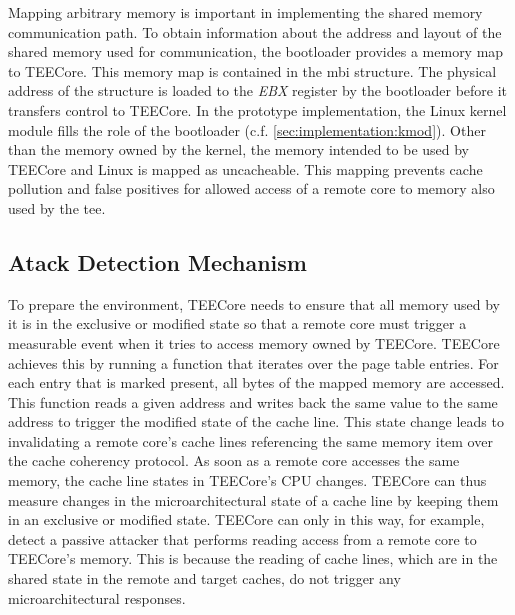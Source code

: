 Mapping arbitrary memory is important in implementing the shared memory
communication path. To obtain information about the address and layout of the
shared memory used for communication, the bootloader provides a memory map to
TEECore. This memory map is contained in the \gls{mbi} structure. The physical
address of the structure is loaded to the \textit{EBX} register by the
bootloader before it transfers control to TEECore. In the prototype
implementation, the Linux kernel module fills the role of the bootloader (c.f.
\ref{sec:implementation:kmod}). Other than the memory owned by the kernel, the
memory intended to be used by TEECore and Linux is mapped as uncacheable. This
mapping prevents cache pollution and false positives for allowed access of a
remote core to memory also used by the \gls{tee}.

\subsection{Atack Detection Mechanism}
\label{sec:implementation:teeKernel:pmcs}
To prepare the environment, TEECore needs to ensure that all memory used by it
is in the exclusive or modified state so that a remote core must trigger a
measurable event when it tries to access memory owned by TEECore. TEECore
achieves this by running a function that iterates over the page table entries.
For each entry that is marked present, all bytes of the mapped memory are
accessed. This function reads a given address and writes back the same value to
the same address to trigger the modified state of the cache line. This state
change leads to invalidating a remote core's cache lines referencing the same
memory item over the cache coherency protocol. As soon as a remote core accesses
the same memory, the cache line states in TEECore's CPU changes. TEECore can
thus measure changes in the microarchitectural state of a cache line by keeping
them in an exclusive or modified state. TEECore can only in this way, for
example, detect a passive attacker that performs reading access from a remote
core to TEECore's memory. This is because the reading of cache lines, which are
in the shared state in the remote and target caches, do not trigger any
microarchitectural responses.\\

